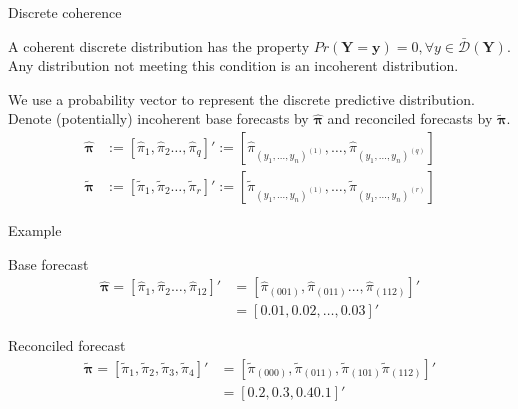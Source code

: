 \documentclass[12pt]{beamer}
\begin{document}
\begin{frame}{Discrete coherence}

\begin{definition}
A coherent discrete distribution has the property $Pr(\mathbf{Y} = 
\mathbf{y}) = 0, \forall y \in \bar{\mathcal{D}}(\mathbf{Y})$. Any distribution not meeting this condition is an incoherent distribution.
\end{definition}

\begin{outline}
    \1 We use a probability vector to represent the discrete predictive distribution.
    \1 Denote (potentially) incoherent base forecasts by $\hat{\boldsymbol{\pi}}$ and reconciled forecasts by $\tilde{\boldsymbol{\pi}}$.
    \[
        \begin{aligned}
      \hat{\boldsymbol{\pi}} &:= [\hat {\pi}_1, \hat\pi_2\dots, \hat \pi_q]' := [\hat{\pi}_{(y_1,\dots,y_n)^{(1)}}, \dots, \hat{\pi}_{(y_1,\dots,y_n)^{(q)}}] \\
      \tilde{\boldsymbol{\pi}} &:= [\tilde {\pi}_1, \tilde\pi_2\dots, \tilde \pi_r]' := [\tilde{\pi}_{(y_1,\dots,y_n)^{(1)}}, \dots, \tilde{\pi}_{(y_1,\dots,y_n)^{(r)}}]
        \end{aligned}
\]
\end{outline}

\end{frame}

\begin{frame}{Example}

\begin{block}{Base forecast}
    \[\begin{aligned}
            \hat{\boldsymbol{\pi}} = [\hat {\pi}_1, \hat\pi_2\dots, \hat \pi_{12}]' &= [\hat{\pi}_{(001)}, \hat{\pi}_{(011)}\dots, \hat{\pi}_{(112)}]' \\ &= [0.01, 0.02, \dots, 0.03]'       
        \end{aligned}\]
\end{block}

\begin{block}{Reconciled forecast}
\[\begin{aligned}
    \tilde{\boldsymbol{\pi}} = [\tilde {\pi}_1, \tilde\pi_2, \tilde\pi_3, \tilde\pi_4]'& = [\tilde{\pi}_{(000)}, \tilde{\pi}_{(011)}, \tilde{\pi}_{(101)}\tilde{\pi}_{(112)}]' \\ &= [0.2, 0.3, 0.4 0.1]'      
\end{aligned}  
\]
    
\end{block}

\end{frame}
\end{document}
